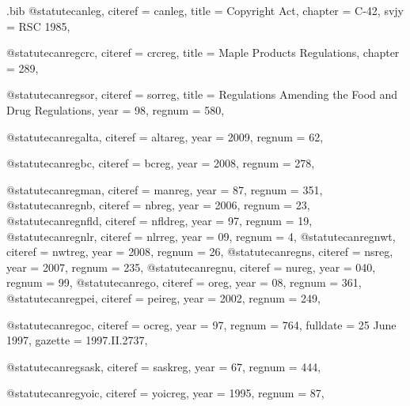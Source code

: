 \begin{filecontents*}{\jobname.bib}
@statute{canleg,
citeref = {canleg},
title = {Copyright Act},
chapter = {C-42},
svjy = {RSC 1985},
}

@statute{canregcrc,
citeref = {crcreg},
title = {Maple Products Regulations},
chapter = {289},
}


@statute{canregsor,
citeref = {sorreg},
title = {Regulations Amending the Food and Drug Regulations},
year = {98},
regnum = {580},
}

@statute{canregalta,
citeref = {altareg},
year = {2009},
regnum = {62},
}

@statute{canregbc,
citeref = {bcreg},
year = {2008},
regnum = {278},
}

@statute{canregman,
citeref = {manreg},
year = {87},
regnum = {351},
}
@statute{canregnb,
citeref = {nbreg},
year = {2006},
regnum = {23},
}
@statute{canregnfld,
citeref = {nfldreg},
year = {97},
regnum = {19},
}
@statute{canregnlr,
citeref = {nlrreg},
year = {09},
regnum = {4},
}
@statute{canregnwt,
citeref = {nwtreg},
year = {2008},
regnum = {26},
}
@statute{canregns,
citeref = {nsreg},
year = {2007},
regnum = {235},
}
@statute{canregnu,
citeref = {nureg},
year = {040},
regnum = {99},
}
@statute{canrego,
citeref = {oreg},
year = {08},
regnum = {361},
}
@statute{canregpei,
citeref = {peireg},
year = {2002},
regnum = {249},
}

@statute{canregoc,
citeref = {ocreg},
year = {97},
regnum = {764},
fulldate = {25 June 1997},
gazette = {1997.II.2737},
}

@statute{canregsask,
citeref = {saskreg},
year = {67},
regnum = {444},
}

@statute{canregyoic,
citeref = {yoicreg},
year = {1995},
regnum = {87},
}







\end{filecontents*}




